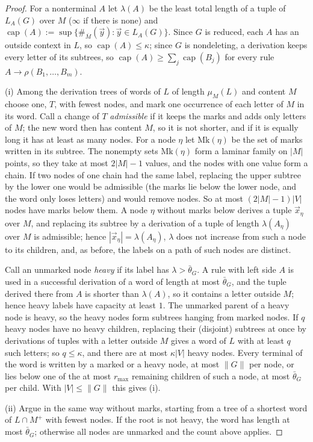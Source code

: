 \documentclass[11pt]{article}
\numberwithin{equation}{section}
\theoremstyle{plain}
\theoremstyle{definition}
\theoremstyle{remark}
\newcommand{\tuple}[1]{\vec{#1}}
\theoremstyle{plain}
\begin{document}
\begin{proof}
For a nonterminal $A$ let $\lambda(A)$ be the least total length of a tuple of
$L_A(G)$ over $M$ ($\infty$ if there is none) and
$\operatorname{cap}(A):=\sup\{\#_{\overline M}(\tuple y):\tuple y\in L_A(G)\}$.  Since
$G$ is reduced, each $A$ has an outside context in $L$, so
$\operatorname{cap}(A)\le\kappa$; since $G$ is nondeleting, a derivation keeps every
letter of its subtrees, so $\operatorname{cap}(A)\ge\sum_j\operatorname{cap}(B_j)$ for
every rule $A\to\rho(B_1,\ldots,B_m)$.

(i) Among the derivation trees of words of $L$ of length $\mu_M(L)$ and content
$M$ choose one, $T$, with fewest nodes, and mark one occurrence of each letter of
$M$ in its word.  Call a change of $T$ \emph{admissible} if it keeps the marks and
adds only letters of $M$; the new word then has content $M$, so it is not
shorter, and if it is equally long it has at least as many nodes.  For a node
$\eta$ let $\mathrm{Mk}(\eta)$ be the set of marks written in its subtree.  The
nonempty sets $\mathrm{Mk}(\eta)$ form a laminar family on $|M|$ points, so they
take at most $2|M|-1$ values, and the nodes with one value form a chain.  If
two nodes of one chain had the same label, replacing the upper subtree by the
lower one would be admissible (the marks lie below the lower node, and the word
only loses letters) and would remove nodes.  So at most $(2|M|-1)|V|$ nodes have
marks below them.  A node $\eta$ without marks below derives a tuple
$\tuple x_\eta$ over $M$, and replacing its subtree by a derivation of a tuple of
length $\lambda(A_\eta)$ over $M$ is admissible; hence
$|\tuple x_\eta|=\lambda(A_\eta)$, $\lambda$ does not increase from such a node to
its children, and, as before, the labels on a path of such nodes are distinct.

Call an unmarked node \emph{heavy} if its label has $\lambda>\bar\theta_G$.  A rule
with left side $A$ is used in a successful derivation of a word of length at
most $\bar\theta_G$, and the tuple derived there from $A$ is shorter than
$\lambda(A)$, so it contains a letter outside $M$; hence heavy labels have
capacity at least $1$.  The unmarked parent of a heavy node is heavy, so the
heavy nodes form subtrees hanging from marked nodes.  If $q$ heavy nodes have no
heavy children, replacing their (disjoint) subtrees at once by derivations of
tuples with a letter outside $M$ gives a word of $L$ with at least $q$ such
letters; so $q\le\kappa$, and there are at most $\kappa|V|$ heavy nodes.  Every
terminal of the word is written by a marked or a heavy node, at most $\|G\|$ per
node, or lies below one of the at most $r_{\max}$ remaining children of such a
node, at most $\bar\theta_G$ per child.  With $|V|\le\|G\|$ this gives (i).

(ii) Argue in the same way without marks, starting from a tree of a shortest
word of $L\cap M^+$ with fewest nodes.  If the root is not heavy, the word has
length at most $\bar\theta_G$; otherwise all nodes are unmarked and the count
above applies.
\end{proof}
\end{document}
